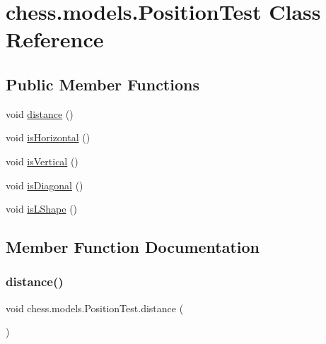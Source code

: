 \hypertarget{classchess_1_1models_1_1_position_test}{}\section{chess.\+models.\+Position\+Test Class Reference}
\label{classchess_1_1models_1_1_position_test}
\subsection*{Public Member Functions}
\begin{DoxyCompactItemize}
\item 
void \mbox{\hyperlink{classchess_1_1models_1_1_position_test_a2c87ca694ac5a063eb1759e5ee3d61a5}{distance}} ()
\item 
void \mbox{\hyperlink{classchess_1_1models_1_1_position_test_ace63643a56fd83257a1a8158008deca1}{is\+Horizontal}} ()
\item 
void \mbox{\hyperlink{classchess_1_1models_1_1_position_test_aabe6af99895ee105f02d28f723b28df4}{is\+Vertical}} ()
\item 
void \mbox{\hyperlink{classchess_1_1models_1_1_position_test_a482dcf5e4aaa0c0ee6a07b60beac9e78}{is\+Diagonal}} ()
\item 
void \mbox{\hyperlink{classchess_1_1models_1_1_position_test_a282101019a4c2533fb93d04d6e0b4a30}{is\+L\+Shape}} ()
\end{DoxyCompactItemize}


\subsection{Member Function Documentation}
\mbox{\label{classchess_1_1models_1_1_position_test_a2c87ca694ac5a063eb1759e5ee3d61a5}} 
\subsubsection{\texorpdfstring{distance()}{distance()}}
{\footnotesize\ttfamily void chess.\+models.\+Position\+Test.\+distance (\begin{DoxyParamCaption}{ }\end{DoxyParamCaption})}


